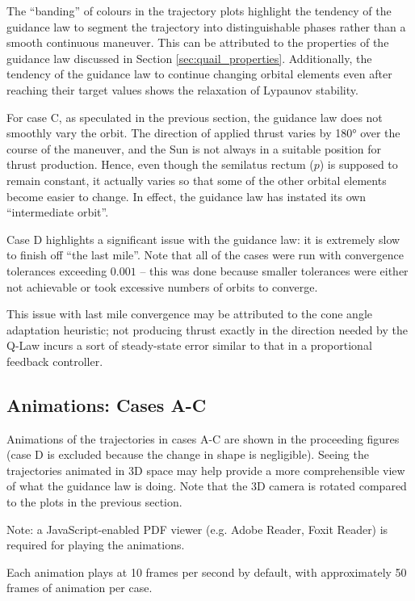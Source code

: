 \newpage
The ``banding'' of colours in the trajectory plots highlight the tendency of the guidance law to segment the trajectory into distinguishable phases rather than a smooth continuous maneuver. This can be attributed to the properties of the guidance law discussed in Section \ref{sec:quail_properties}. Additionally, the tendency of the guidance law to continue changing orbital elements even after reaching their target values shows the relaxation of Lypaunov stability.

For case C, as speculated in the previous section, the guidance law does not smoothly vary the orbit. The direction of applied thrust varies by \ang{180} over the course of the maneuver, and the Sun is not always in a suitable position for thrust production. Hence, even though the semilatus rectum (\(p\)) is supposed to remain constant, it actually varies so that some of the other orbital elements become easier to change. In effect, the guidance law has instated its own ``intermediate orbit''.

Case D highlights a significant issue with the guidance law: it is extremely slow to finish off ``the last mile''. Note that all of the cases were run with convergence tolerances exceeding \(0.001\) -- this was done because smaller tolerances were either not achievable or took excessive numbers of orbits to converge.

This issue with last mile convergence may be attributed to the cone angle adaptation heuristic; not producing thrust exactly in the direction needed by the Q-Law incurs a sort of steady-state error similar to that in a proportional feedback controller.

\subsection{Animations: Cases A-C}
Animations of the trajectories in cases A-C are shown in the proceeding figures (case D is excluded because the change in shape is negligible). Seeing the trajectories animated in 3D space may help provide a more comprehensible view of what the guidance law is doing. Note that the 3D camera is rotated compared to the plots in the previous section.

Note: a JavaScript-enabled PDF viewer (e.g. Adobe Reader, Foxit Reader) is required for playing the animations.

Each animation plays at 10 frames per second by default, with approximately 50 frames of animation per case.

